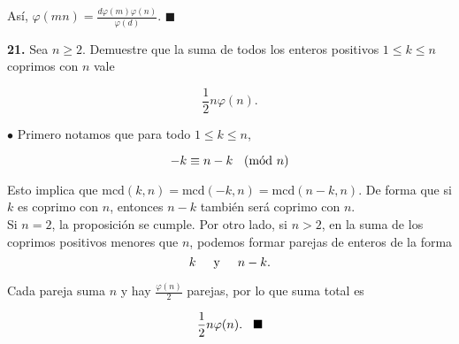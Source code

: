 \documentclass{article}
\newcommand{\Mod}[1]{\ \hspace{0.2cm} (\mathrm{m\acute{o}d}\ #1)}
\begin{document}
Así, $\varphi(mn) = \frac{d \varphi(m)\varphi(n)}{\varphi(d)}$. $\blacksquare$

\newpage

\begin{mybox}
	\textbf{21. } Sea $n \geq 2$. Demuestre que la suma de todos los enteros positivos $1 \leq k \leq n$ coprimos con $n$ vale
	
	$$ \frac{1}{2} n \varphi(n) .$$
\end{mybox}	

$ \bullet $ Primero notamos que para todo $1 \leq k \leq n$,

$$ -k \equiv n - k  \Mod{n}$$

Esto implica que $ \text{mcd}(k, n) = \text{mcd}(-k, n) = \text{mcd}(n -k, n) $. De forma que si $k$ es coprimo con $n$, entonces $n - k$ también será coprimo con $n$. \\

Si $n = 2$, la proposición se cumple. Por otro lado, si $n > 2$, en la suma de los coprimos positivos menores que $n$, podemos formar parejas de enteros de la forma
$$ k \hspace{0.5cm} \text{y} \hspace{0.5cm} n - k.$$

Cada pareja suma $n$ y hay $\frac{\varphi(n)}{2}$ parejas, por lo que suma total es

$$ \frac{1}{2} n \varphi(n) . \hspace{0.3cm} \blacksquare$$
\end{document}
